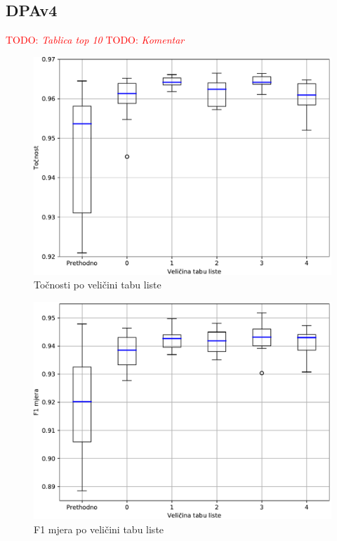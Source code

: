 \documentclass[times, utf8, numeric, diplomski]{fer}
\def\TODO#1{\noindent\textcolor{red}{TODO: \textit{#1}}\newline}
\def\todo#1{\TODO{#1}}
\begin{document}
%

\subsection{DPAv4}
\todo{Tablica top 10}
\todo{Komentar}

\begin{figure}[H]
\includegraphics[width=.9\textwidth]{GP_9class_acc_plus.pdf}
\centering
\caption{Točnosti po veličini tabu liste}
\label{fig:gp_9_acc}
\end{figure}

\begin{figure}[H]
\includegraphics[width=.9\textwidth]{GP_9class_f1_plus.pdf}
\centering
\caption{F1 mjera po veličini tabu liste}
\label{fig:gp_9_f1}
\end{figure}
\end{document}
